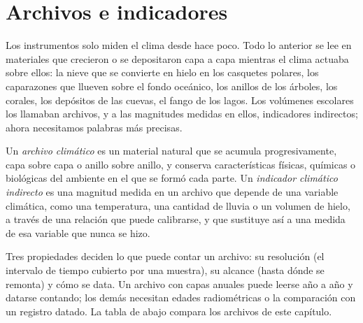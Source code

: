 \section{Archivos e indicadores}\label{sec:b2:climate-proxies:archives}

Los instrumentos solo miden el clima desde hace poco. Todo lo anterior se lee en materiales
que crecieron o se depositaron capa a capa mientras el clima actuaba sobre ellos: la nieve que se convierte en hielo en los
casquetes polares, los caparazones que llueven sobre el fondo oceánico, los anillos de los árboles, los corales, los depósitos de
las cuevas, el fango de los lagos. Los volúmenes escolares los llamaban archivos, y a las magnitudes medidas en
ellos, indicadores indirectos; ahora necesitamos palabras más precisas.

\begin{definition}\label{def:b2:climate-proxies:proxy}
Un \emph{archivo climático} es un material natural que se acumula
progresivamente, capa sobre capa o anillo sobre anillo, y conserva características físicas, químicas o biológicas
del ambiente en el que se formó cada parte. Un \emph{indicador climático
indirecto} es una magnitud medida en un archivo que depende de una variable
climática, como una temperatura, una cantidad de lluvia o un volumen de hielo, a través de una relación que puede
calibrarse, y que sustituye así a una medida de esa variable que nunca se hizo.
\end{definition}

Tres propiedades deciden lo que puede contar un archivo: su resolución (el intervalo de tiempo cubierto por una
muestra), su alcance (hasta dónde se remonta) y cómo se data. Un archivo con capas anuales puede
leerse año a año y datarse contando; los demás necesitan edades radiométricas o la comparación con un
registro datado. La tabla de abajo compara los archivos de este capítulo.

